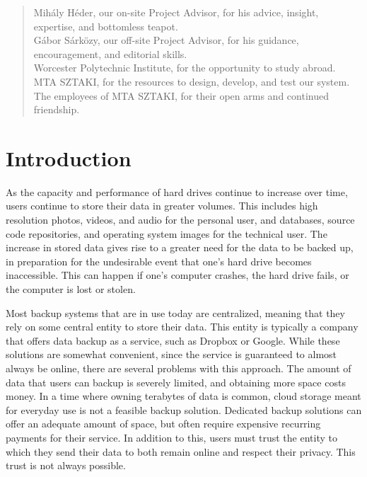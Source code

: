 \documentclass[12pt]{report}
\begin{document}
\renewcommand{\abstractname}{Acknowledgements}
\begin{abstract}
Mih\'aly H\'eder, our on-site Project Advisor, for his advice, insight, expertise, and bottomless teapot.\\

\noindent G\'abor S\'ark\"ozy, our off-site Project Advisor, for his guidance, encouragement, and editorial skills. \\

\noindent Worcester Polytechnic Institute, for the opportunity to study abroad. \\

\noindent MTA SZTAKI, for the resources to design, develop, and test our system. \\

\noindent The employees of MTA SZTAKI, for their open arms and continued friendship.
\end{abstract}

\tableofcontents
\listoffigures

\chapter{Introduction}

As the capacity and performance of hard drives continue to increase over time, users continue to store their data in greater volumes. This includes high resolution photos, videos, and audio for the personal user, and databases, source code repositories, and operating system images for the technical user. The increase in stored data gives rise to a greater need for the data to be backed up, in preparation for the undesirable event that one's hard drive becomes inaccessible. This can happen if one's computer crashes, the hard drive fails, or the computer is lost or stolen.

Most backup systems that are in use today are centralized, meaning that they rely on some central entity to store their data. This entity is typically a company that offers data backup as a service, such as Dropbox or Google. While these solutions are somewhat convenient, since the service is guaranteed to almost always be online, there are several problems with this approach. The amount of data that users can backup is severely limited, and obtaining more space costs money. In a time where owning terabytes of data is common, cloud storage meant for everyday use is not a feasible backup solution. Dedicated backup solutions can offer an adequate amount of space, but often require expensive recurring payments for their service. In addition to this, users must trust the entity to which they send their data to both remain online and respect their privacy. This trust is not always possible.
\end{document}

